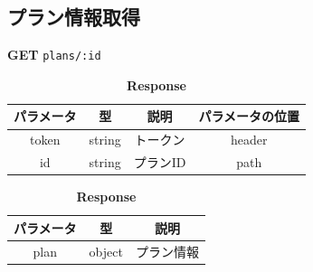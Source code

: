 \subsection{プラン情報取得}
\textbf{GET} \texttt{plans/:id}
\begin{table}[H]
  \begin{minipage}
    {0.5\hsize}
    \centering
    \captionsetup{labelformat=empty,labelsep=none} \caption{\textbf{Request}}
    \begin{tabular}{|c|c|c|c|} \hline
      パラメータ & 型      & 説明    & パラメータの位置 \\ \hline \hline
      token & string & トークン  & header   \\ \hline
      id    & string & プランID & path     \\ \hline
    \end{tabular}
  \end{minipage}
  \begin{minipage}
    {0.5\hsize}
    \centering
    \captionsetup{labelformat=empty,labelsep=none} \caption{\textbf{Response}}
    \begin{tabular}{|c|c|c|} \hline
      パラメータ & 型      & 説明    \\ \hline \hline
      plan  & object & プラン情報 \\ \hline
    \end{tabular}
  \end{minipage}
\end{table}

